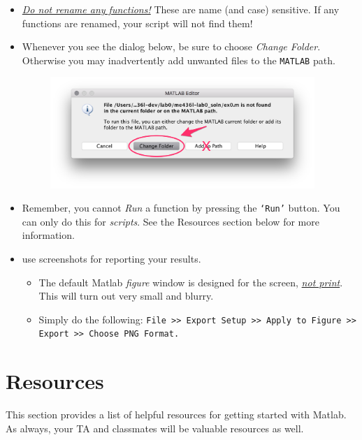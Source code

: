 \documentclass[11pt, letterpaper]{article}
\begin{document}
\begin{itemize}
    \setlength\itemsep{0.5em}
    \item \textit{\ul{Do not rename any functions!}} These are name (and case) sensitive. If any functions are renamed, your script will not find them!
    \item Whenever you see the dialog below, be sure to choose \textit{Change Folder}. Otherwise you may inadvertently add unwanted files to the \texttt{MATLAB} path.

\begin{figure}[H]
    \begin{center}
        \includegraphics[width=100mm]{gfx/add_path_warning.png}
    \end{center}
\end{figure}

\item Remember, you cannot \textit{Run} a function by pressing the \texttt{`Run'} button. You can only do this for \textit{scripts}. See the Resources section below for more information.

\item {} use screenshots for reporting your results.
\begin{itemize}
    \setlength\itemsep{0.5em}
         \item {} The default Matlab \textit{figure} window is designed for the screen, \textit{\ul{not print}}. This will turn out very small and blurry. 
         \item Simply do the following: \texttt{File >> Export Setup >> Apply to Figure >> Export >> Choose PNG Format.}
\end{itemize}


\end{itemize}


\newpage
\section*{Resources}
This section provides a list of helpful resources for getting started with Matlab. As always, your TA and classmates will be valuable resources as well.
\end{document}
